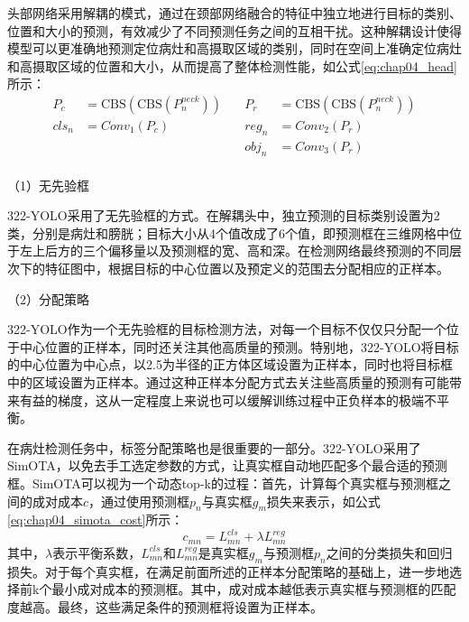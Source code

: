 头部网络采用解耦的模式，通过在颈部网络融合的特征中独立地进行目标的类别、位置和大小的预测，有效减少了不同预测任务之间的互相干扰。这种解耦设计使得模型可以更准确地预测定位病灶和高摄取区域的类别，同时在空间上准确定位病灶和高摄取区域的位置和大小，从而提高了整体检测性能，如公式\ref{eq:chap04_head}所示：
\begin{equation}
  \begin{aligned}
    P_c   & = \text{CBS}(\text{CBS}(P_n^{neck})) & \quad P_r   & = \text{CBS}(\text{CBS}(P_n^{neck})) \\
    cls_n & = Conv_1(P_c)                        & \quad reg_n & = Conv_2(P_r)                        \\
          &                                      & \quad obj_n & = Conv_3(P_r)                        \\
  \end{aligned}
  \label{eq:chap04_head}
\end{equation}

（1）无先验框

322-YOLO采用了无先验框的方式。在解耦头中，独立预测的目标类别设置为2类，分别是病灶和膀胱；目标大小从4个值改成了6个值，即预测框在三维网格中位于左上后方的三个偏移量以及预测框的宽、高和深。在检测网络最终预测的不同层次下的特征图中，根据目标的中心位置以及预定义的范围去分配相应的正样本。

（2）分配策略

322-YOLO作为一个无先验框的目标检测方法，对每一个目标不仅仅只分配一个位于中心位置的正样本，同时还关注其他高质量的预测。特别地，322-YOLO将目标的中心位置为中心点，以2.5为半径的正方体区域设置为正样本，同时也将目标框中的区域设置为正样本。通过这种正样本分配方式去关注些高质量的预测有可能带来有益的梯度，这从一定程度上来说也可以缓解训练过程中正负样本的极端不平衡。

在病灶检测任务中，标签分配策略也是很重要的一部分。322-YOLO采用了SimOTA\cite{ge2021yolox}，以免去手工选定参数的方式，让真实框自动地匹配多个最合适的预测框。SimOTA可以视为一个动态top-k的过程：首先，计算每个真实框与预测框之间的成对成本\(c\)，通过使用预测框\(p_n\)与真实框\(g_m\)损失来表示，如公式\ref{eq:chap04_simota_cost}所示：
\begin{equation}
  c_{mn} = L^{cls}_{mn} + \lambda L^{reg}_{mn}
  \label{eq:chap04_simota_cost}
\end{equation}
其中，\(\lambda\)表示平衡系数，\(L^{cls}_{mn}\)和\(L^{reg}_{mn}\)是真实框\(g_m\)与预测框\(p_n\)之间的分类损失和回归损失。对于每个真实框，在满足前面所述的正样本分配策略的基础上，进一步地选择前k个最小成对成本的预测框。其中，成对成本越低表示真实框与预测框的匹配度越高。最终，这些满足条件的预测框将设置为正样本。

